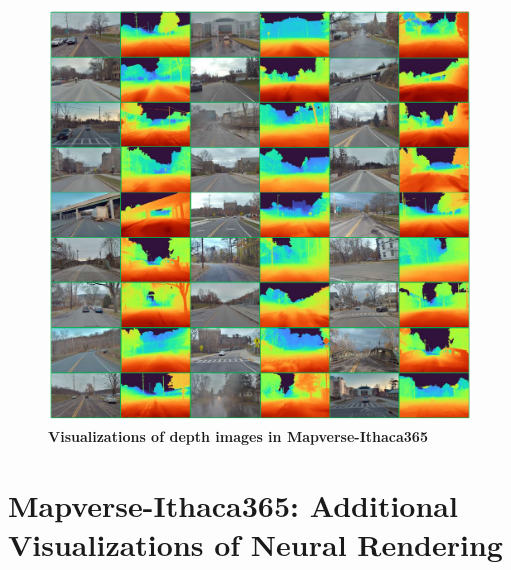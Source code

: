 \begin{figure}[ht]
    \centering
    \includegraphics[width=\linewidth]{figs_compressed/ithaca-depth-app_compressed.pdf}
    \caption{\textbf{Visualizations of depth images in Mapverse-Ithaca365}}
    \label{fig:ithaca-depth-appendix}
\end{figure}


\clearpage


\section{Mapverse-Ithaca365: Additional Visualizations of Neural Rendering}


